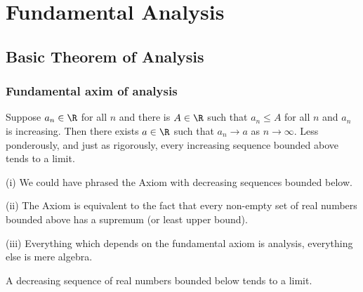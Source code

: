 \chapter{Fundamental Analysis}


\section{Basic Theorem of Analysis}%

\subsection{Fundamental axim of analysis}

\begin{axiom}\label{axm:fundamental_axiom_of_analysis}
Suppose $a_n\in\R$ for all $n$ and there is $A\in\R$ such that $a_n\leq A$ for all $n$ and $a_n$ is increasing. Then there exists $a\in\R$ such that $a_n\to a$ as $n\to\infty$. Less ponderously, and just as rigorously, every increasing sequence bounded above tends to a limit.
\end{axiom}

\begin{remark}
\ben
\item [(i)] We could have phrased the Axiom with decreasing sequences bounded below.
\item [(ii)] The Axiom is equivalent to the fact that every non-empty set of real numbers bounded above has a supremum (or least upper bound).
\item [(iii)] Everything which depends on the fundamental axiom is analysis, everything else is mere algebra.
\een
\end{remark}

\begin{proposition}\label{pro:decreasing_sequence_bounded_below}
A decreasing sequence of real numbers bounded below tends to a limit.
\end{proposition}

